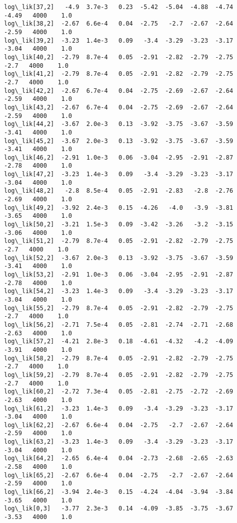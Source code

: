 \documentclass[11pt]{article}
\begin{document}
\begin{Verbatim}[commandchars=\\\{\}]
log\_lik[37,2]   -4.9  3.7e-3   0.23  -5.42  -5.04  -4.88  -4.74  -4.49   4000    1.0
log\_lik[38,2]  -2.67  6.6e-4   0.04  -2.75   -2.7  -2.67  -2.64  -2.59   4000    1.0
log\_lik[39,2]  -3.23  1.4e-3   0.09   -3.4  -3.29  -3.23  -3.17  -3.04   4000    1.0
log\_lik[40,2]  -2.79  8.7e-4   0.05  -2.91  -2.82  -2.79  -2.75   -2.7   4000    1.0
log\_lik[41,2]  -2.79  8.7e-4   0.05  -2.91  -2.82  -2.79  -2.75   -2.7   4000    1.0
log\_lik[42,2]  -2.67  6.7e-4   0.04  -2.75  -2.69  -2.67  -2.64  -2.59   4000    1.0
log\_lik[43,2]  -2.67  6.7e-4   0.04  -2.75  -2.69  -2.67  -2.64  -2.59   4000    1.0
log\_lik[44,2]  -3.67  2.0e-3   0.13  -3.92  -3.75  -3.67  -3.59  -3.41   4000    1.0
log\_lik[45,2]  -3.67  2.0e-3   0.13  -3.92  -3.75  -3.67  -3.59  -3.41   4000    1.0
log\_lik[46,2]  -2.91  1.0e-3   0.06  -3.04  -2.95  -2.91  -2.87  -2.78   4000    1.0
log\_lik[47,2]  -3.23  1.4e-3   0.09   -3.4  -3.29  -3.23  -3.17  -3.04   4000    1.0
log\_lik[48,2]   -2.8  8.5e-4   0.05  -2.91  -2.83   -2.8  -2.76  -2.69   4000    1.0
log\_lik[49,2]  -3.92  2.4e-3   0.15  -4.26   -4.0   -3.9  -3.81  -3.65   4000    1.0
log\_lik[50,2]  -3.21  1.5e-3   0.09  -3.42  -3.26   -3.2  -3.15  -3.06   4000    1.0
log\_lik[51,2]  -2.79  8.7e-4   0.05  -2.91  -2.82  -2.79  -2.75   -2.7   4000    1.0
log\_lik[52,2]  -3.67  2.0e-3   0.13  -3.92  -3.75  -3.67  -3.59  -3.41   4000    1.0
log\_lik[53,2]  -2.91  1.0e-3   0.06  -3.04  -2.95  -2.91  -2.87  -2.78   4000    1.0
log\_lik[54,2]  -3.23  1.4e-3   0.09   -3.4  -3.29  -3.23  -3.17  -3.04   4000    1.0
log\_lik[55,2]  -2.79  8.7e-4   0.05  -2.91  -2.82  -2.79  -2.75   -2.7   4000    1.0
log\_lik[56,2]  -2.71  7.5e-4   0.05  -2.81  -2.74  -2.71  -2.68  -2.63   4000    1.0
log\_lik[57,2]  -4.21  2.8e-3   0.18  -4.61  -4.32   -4.2  -4.09  -3.91   4000    1.0
log\_lik[58,2]  -2.79  8.7e-4   0.05  -2.91  -2.82  -2.79  -2.75   -2.7   4000    1.0
log\_lik[59,2]  -2.79  8.7e-4   0.05  -2.91  -2.82  -2.79  -2.75   -2.7   4000    1.0
log\_lik[60,2]  -2.72  7.3e-4   0.05  -2.81  -2.75  -2.72  -2.69  -2.63   4000    1.0
log\_lik[61,2]  -3.23  1.4e-3   0.09   -3.4  -3.29  -3.23  -3.17  -3.04   4000    1.0
log\_lik[62,2]  -2.67  6.6e-4   0.04  -2.75   -2.7  -2.67  -2.64  -2.59   4000    1.0
log\_lik[63,2]  -3.23  1.4e-3   0.09   -3.4  -3.29  -3.23  -3.17  -3.04   4000    1.0
log\_lik[64,2]  -2.65  6.4e-4   0.04  -2.73  -2.68  -2.65  -2.63  -2.58   4000    1.0
log\_lik[65,2]  -2.67  6.6e-4   0.04  -2.75   -2.7  -2.67  -2.64  -2.59   4000    1.0
log\_lik[66,2]  -3.94  2.4e-3   0.15  -4.24  -4.04  -3.94  -3.84  -3.65   4000    1.0
log\_lik[0,3]   -3.77  2.3e-3   0.14  -4.09  -3.85  -3.75  -3.67  -3.53   4000    1.0

\end{Verbatim}
\end{document}
